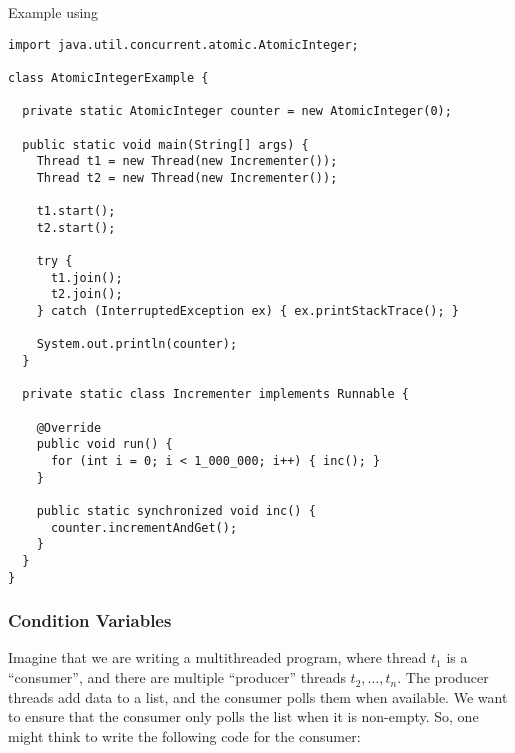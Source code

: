 \begin{cl}{Example using }
\begin{lstlisting}[language=MyJava]
import java.util.concurrent.atomic.AtomicInteger;

class AtomicIntegerExample {

  private static AtomicInteger counter = new AtomicInteger(0);

  public static void main(String[] args) {
    Thread t1 = new Thread(new Incrementer());
    Thread t2 = new Thread(new Incrementer());

    t1.start();
    t2.start();

    try {
      t1.join();
      t2.join();
    } catch (InterruptedException ex) { ex.printStackTrace(); }

    System.out.println(counter);
  }

  private static class Incrementer implements Runnable {

    @Override
    public void run() {
      for (int i = 0; i < 1_000_000; i++) { inc(); }
    }

    public static synchronized void inc() {
      counter.incrementAndGet();
    }
  }
}
\end{lstlisting}
\end{cl}



\subsubsection*{Condition Variables}

\example Imagine that we are writing a multithreaded program, where thread $t_1$ is a ``consumer'', and there are multiple ``producer'' threads $t_2, \ldots, t_n$. The producer threads add data to a list, and the consumer polls them when available. We want to ensure that the consumer only polls the list when it is non-empty. So, one might think to write the following code for the consumer:

